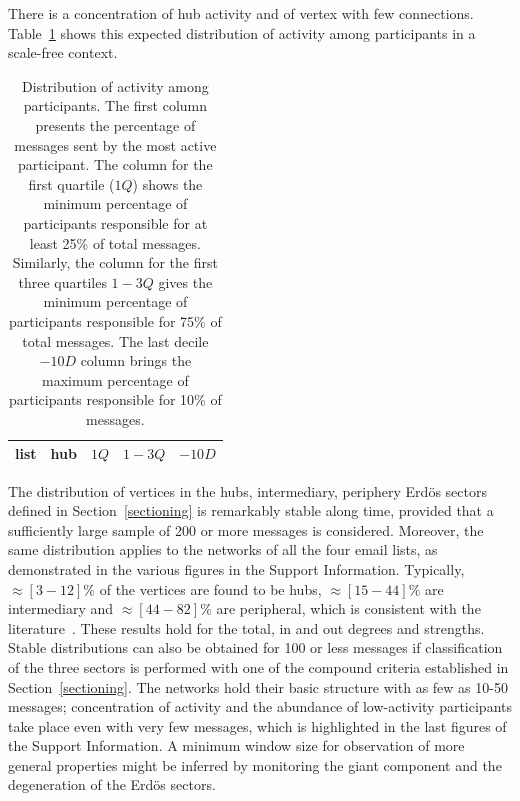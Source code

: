 \documentclass[%
 aip,
 jmp,%
 amsmath,amssymb,
 reprint,%
]{revtex4-1}
\begin{document}
There is a concentration of hub activity and of vertex with few connections. Table~\ref{autores} shows this expected distribution of activity among participants in a scale-free context.

\begin{table}[!h]
    \caption{Distribution of activity among participants. The first column presents the percentage of messages sent by the most active participant. The column for the first quartile ($1Q$) shows the minimum percentage of participants responsible for at least 25\% of total messages. Similarly, the column for the first three quartiles $1-3Q$ gives the minimum percentage of participants responsible for 75\% of total messages. The last decile $-10D$ column brings the maximum percentage of participants responsible for 10\% of messages.}
\begin{center}
    \begin{tabular}{ | l ||  c | c | c | c | }
        \hline
        list & hub & $ 1Q $ & $ 1-3Q $ & $-10D$ \\ \hline
	
    \end{tabular}
\end{center}
\label{autores}
\end{table}

The distribution of vertices in the hubs, intermediary, periphery Erd\"os sectors defined in Section~\ref{sectioning} is remarkably stable along time, provided that a sufficiently large sample of 200 or more messages is considered. 
Moreover, the same distribution applies to the networks of all the four email lists, as demonstrated in the various figures in the Support Information. 
Typically, $\approx [3-12]\%$ of the vertices are found to be hubs, $\approx [15-44]\%$ are intermediary and $\approx [44-82]\%$ are peripheral, which is consistent with the literature~\cite{secFree}.
These results hold for the total, in and out degrees and strengths.
Stable distributions can also be obtained for 100 or less messages if classification of the three sectors is performed with one of the compound criteria established in Section~\ref{sectioning}. 
The networks hold their basic structure with as few as 10-50 messages; concentration of activity and the abundance of low-activity participants take place even with very few messages, which is highlighted in the last figures of the Support Information.
A minimum window size for observation of more general properties might be inferred by monitoring the giant component and the degeneration of the Erd\"os sectors.
\end{document}
